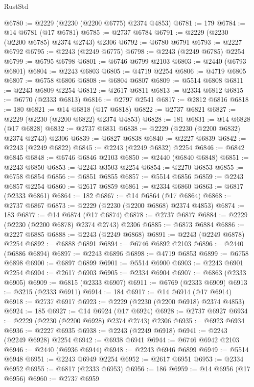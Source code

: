 \begin{lexlean}{RustStd}
\begin{coremodule}
@6780 := @2229 (@2230 (@2200 @6775) @2374 @4853)
@6781 := 179
@6784 := @14 @6781 (@17 @6781)
@6785 := @2737 @6784
@6791 := @2229 (@2230 (@2200 @6785) @2374 @2743) @2306
@6792 := @6780 @6791
@6793 := @2227 @6792
@6795 := @2243 (@2249 @6775)
@6798 := @2243 (@2249 @6785) @2254
@6799 := @6795 @6798
@6801 := @6746 @6799 @2103
@6803 := @2440 (@6793 @6801)
@6804 := @2243 @6803
@6805 := @4719 @2254
@6806 := @4719 @6805
@6807 := @6758 @6806
@6808 := @6804 @6807
@6809 := @5514 @6808
@6811 := @2243 @6809 @2254
@6812 := @2617 @6811
@6813 := @2334 @6812
@6815 := @6770 (@2333 @6813)
@6816 := @2797 @2541
@6817 := @2812 @6816
@6818 := 180
@6821 := @14 @6818 (@17 @6818)
@6822 := @2737 @6821
@6827 := @2229 (@2230 (@2200 @6822) @2374 @4853)
@6828 := 181
@6831 := @14 @6828 (@17 @6828)
@6832 := @2737 @6831
@6838 := @2229 (@2230 (@2200 @6832) @2374 @2743) @2306
@6839 := @6827 @6838
@6840 := @2227 @6839
@6842 := @2243 (@2249 @6822)
@6845 := @2243 (@2249 @6832) @2254
@6846 := @6842 @6845
@6848 := @6746 @6846 @2103
@6850 := @2440 (@6840 @6848)
@6851 := @2243 @6850
@6853 := @2243 @3503 @2254
@6854 := @2270 @6853
@6855 := @6758 @6854
@6856 := @6851 @6855
@6857 := @5514 @6856
@6859 := @2243 @6857 @2254
@6860 := @2617 @6859
@6861 := @2334 @6860
@6863 := @6817 (@2333 @6861)
@6864 := 182
@6867 := @14 @6864 (@17 @6864)
@6868 := @2737 @6867
@6873 := @2229 (@2230 (@2200 @6868) @2374 @4853)
@6874 := 183
@6877 := @14 @6874 (@17 @6874)
@6878 := @2737 @6877
@6884 := @2229 (@2230 (@2200 @6878) @2374 @2743) @2306
@6885 := @6873 @6884
@6886 := @2227 @6885
@6888 := @2243 (@2249 @6868)
@6891 := @2243 (@2249 @6878) @2254
@6892 := @6888 @6891
@6894 := @6746 @6892 @2103
@6896 := @2440 (@6886 @6894)
@6897 := @2243 @6896
@6898 := @4719 @6853
@6899 := @6758 @6898
@6900 := @6897 @6899
@6901 := @5514 @6900
@6903 := @2243 @6901 @2254
@6904 := @2617 @6903
@6905 := @2334 @6904
@6907 := @6863 (@2333 @6905)
@6909 := @6815 (@2333 @6907)
@6911 := @6769 (@2333 @6909)
@6913 := @3215 (@2333 @6911)
@6914 := 184
@6917 := @14 @6914 (@17 @6914)
@6918 := @2737 @6917
@6923 := @2229 (@2230 (@2200 @6918) @2374 @4853)
@6924 := 185
@6927 := @14 @6924 (@17 @6924)
@6928 := @2737 @6927
@6934 := @2229 (@2230 (@2200 @6928) @2374 @2743) @2306
@6935 := @6923 @6934
@6936 := @2227 @6935
@6938 := @2243 (@2249 @6918)
@6941 := @2243 (@2249 @6928) @2254
@6942 := @6938 @6941
@6944 := @6746 @6942 @2103
@6946 := @2440 (@6936 @6944)
@6948 := @2243 @6946 @6899
@6949 := @5514 @6948
@6951 := @2243 @6949 @2254
@6952 := @2617 @6951
@6953 := @2334 @6952
@6955 := @6817 (@2333 @6953)
@6956 := 186
@6959 := @14 @6956 (@17 @6956)
@6960 := @2737 @6959

\end{coremodule}
\end{lexlean}
